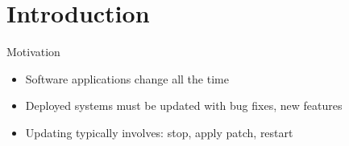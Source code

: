 \section{Introduction}
\begin{frame}{Motivation}%
\begin{itemize}
\item Software applications change all the time
\item Deployed systems must be updated with bug fixes, new features
\item Updating typically involves: stop, apply patch, restart
\end{itemize}
\end{frame}

\begin{frame}{}%
\end{frame}
